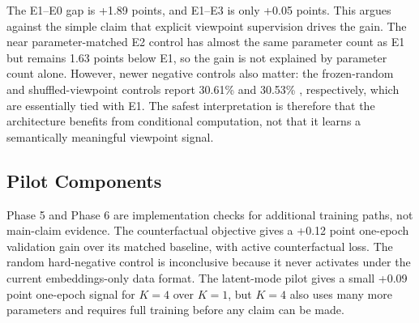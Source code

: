 The E1--E0 gap is +1.89 points, and E1--E3 is only +0.05 points. This argues against the simple claim that explicit viewpoint supervision drives the gain. The near parameter-matched E2 control has almost the same parameter count as E1 but remains 1.63 points below E1, so the gain is not explained by parameter count alone. However, newer negative controls also matter: the frozen-random and shuffled-viewpoint controls report 30.61\% and 30.53\% \acc{}, respectively, which are essentially tied with E1. The safest interpretation is therefore that the architecture benefits from conditional computation, not that it learns a semantically meaningful viewpoint signal.

\subsection{Pilot Components}

Phase 5 and Phase 6 are implementation checks for additional training paths, not main-claim evidence. The counterfactual objective gives a +0.12 point one-epoch validation gain over its matched baseline, with active counterfactual loss. The random hard-negative control is inconclusive because it never activates under the current embeddings-only data format. The latent-mode pilot gives a small +0.09 point one-epoch signal for $K=4$ over $K=1$, but $K=4$ also uses many more parameters and requires full training before any claim can be made.

\FloatBarrier
